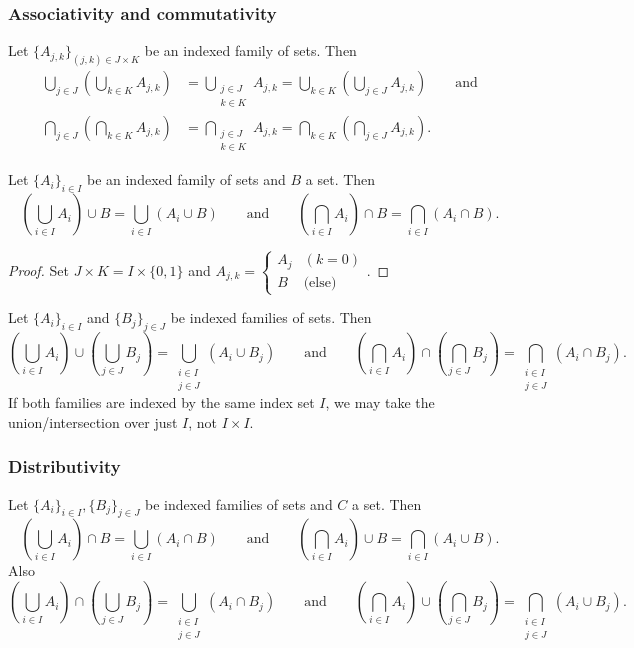 \subsubsection{Associativity and commutativity}
\begin{lemma} \label{setAssociativityCommutativity}
Let $\{A_{j,k}\}_{(j,k) \in J\times K}$ be an indexed family of sets. Then
\begin{align*}
\bigcup_{j\in J}\left(\bigcup_{k\in K}A_{j,k}\right) &= \bigcup_{\substack{j\in J \\ k\in K}}A_{j,k} = \bigcup_{k\in K}\left(\bigcup_{j\in J}A_{j,k}\right) \qquad\text{and} \\
\bigcap_{j\in J}\left(\bigcap_{k\in K}A_{j,k}\right) &= \bigcap_{\substack{j\in J \\ k\in K}}A_{j,k} = \bigcap_{k\in K}\left(\bigcap_{j\in J}A_{j,k}\right).
\end{align*}
\end{lemma}
\begin{corollary}
Let $\{A_{i}\}_{i \in I}$ be an indexed family of sets and $B$ a set. Then
\[ \left(\bigcup_{i\in I}A_i\right)\cup B = \bigcup_{i\in I}(A_i\cup B) \qquad\text{and}\qquad \left(\bigcap_{i\in I}A_i\right)\cap B = \bigcap_{i\in I}(A_i\cap B). \]
\end{corollary}
\begin{proof}
Set $J\times K = I\times\{0,1\}$ and $A_{j,k} = \begin{cases}
A_j & (k=0) \\
B & \text{(else)}
\end{cases}$.
\end{proof}
\begin{corollary}
Let $\{A_{i}\}_{i \in I}$ and $\{B_{j}\}_{j \in J}$ be indexed families of sets. Then
\[ \left(\bigcup_{i\in I}A_i\right)\cup \left(\bigcup_{j\in J}B_j\right) = \bigcup_{\substack{i\in I\\j\in J}}(A_i\cup B_j) \qquad\text{and}\qquad \left(\bigcap_{i\in I}A_i\right)\cap \left(\bigcap_{j\in J}B_j\right) = \bigcap_{\substack{i\in I\\j\in J}}(A_i\cap B_j). \]
If both families are indexed by the same index set $I$, we may take the union/intersection over just $I$, not $I\times I$.
\end{corollary}

\subsubsection{Distributivity}
\begin{lemma} \label{setDistributivity}
Let $\{A_{i}\}_{i \in I}, \{B_{j}\}_{j \in J}$ be indexed families of sets and $C$ a set. Then
\[ \left(\bigcup_{i\in I}A_i\right)\cap B = \bigcup_{i\in I}(A_i\cap B) \qquad\text{and}\qquad \left(\bigcap_{i\in I}A_i\right)\cup B = \bigcap_{i\in I}(A_i\cup B). \]
Also
\[ \left(\bigcup_{i\in I}A_i\right)\cap \left(\bigcup_{j\in J}B_j\right) = \bigcup_{\substack{i\in I\\j\in J}}(A_i\cap B_j) \qquad\text{and}\qquad \left(\bigcap_{i\in I}A_i\right)\cup \left(\bigcap_{j\in J}B_j\right) = \bigcap_{\substack{i\in I\\j\in J}}(A_i\cup B_j). \]
\end{lemma}

